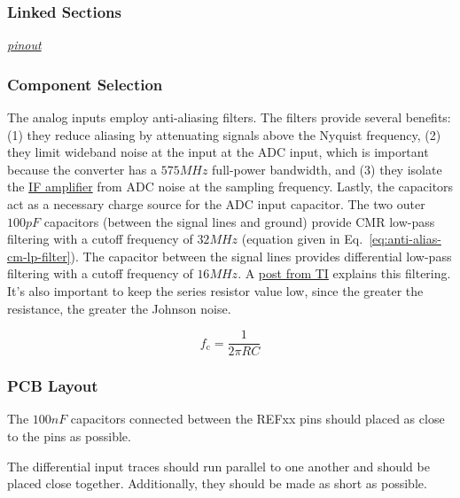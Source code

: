 \subsubsection{Linked Sections}
\label{sec:ltc2292-linked-sections}

\textit{\hyperref[sec:ltc2292-pinout]{pinout}}

\subsubsection{Component Selection}
\label{sec:ltc2292-component-selection}


The analog inputs employ anti-aliasing filters. The filters provide several benefits: (1) they
reduce aliasing by attenuating signals above the Nyquist frequency, (2) they limit wideband noise at
the input at the ADC input, which is important because the converter has a $575 \si{MHz}$ full-power
bandwidth, and (3) they isolate the \hyperref[sec:ada4940-2]{IF amplifier} from ADC noise at the
sampling frequency. Lastly, the capacitors act as a necessary charge source for the ADC input
capacitor. The two outer $100 \si{pF}$ capacitors (between the signal lines and ground) provide CMR
low-pass filtering with a cutoff frequency of $32 \si{MHz}$ (equation given in
Eq.~\ref{eq:anti-alias-cm-lp-filter}). The capacitor between the signal lines provides differential
low-pass filtering with a cutoff frequency of $16 \si{MHz}$. A
\href{https://e2e.ti.com/blogs_/archives/b/precisionhub/archive/2015/11/06/three-guidelines-for-designing-anti-aliasing-filters}{post
  from TI} explains this filtering. It's also important to keep the series resistor value low, since
the greater the resistance, the greater the Johnson noise.

\begin{equation}
        \label{eq:anti-alias-cm-lp-filter}
        f_{\text{c}} = \frac{1}{2 \pi R C}
\end{equation}

\subsubsection{PCB Layout}
\label{sec:ltc2292-pcb}

The $100 \si{nF}$ capacitors connected between the REFxx pins should placed as close to the pins as
possible.

The differential input traces should run parallel to one another and should be placed close
together. Additionally, they should be made as short as possible.

